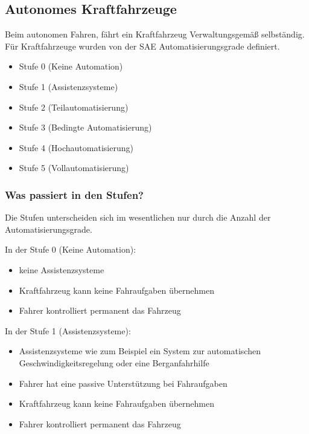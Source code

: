 \subsection{Autonomes Kraftfahrzeuge}
Beim autonomen Fahren, fährt ein Kraftfahrzeug Verwaltungsgemäß selbständig.
Für Kraftfahrzeuge wurden von der \ac{SAE} Automatisierungsgrade definiert\cite{PRACTICE}.
\begin{itemize}
	\item Stufe 0 (Keine Automation)
	\item Stufe 1 (Assistenzsysteme)
	\item Stufe 2 (Teilautomatisierung)
	\item Stufe 3 (Bedingte Automatisierung)
	\item Stufe 4 (Hochautomatisierung)
	\item Stufe 5 (Vollautomatisierung)
\end{itemize}
\subsubsection{Was passiert in den Stufen?}
Die Stufen unterscheiden sich im wesentlichen nur durch die Anzahl der Automatisierungsgrade.

\vspace{0.5cm}

In der Stufe 0 (Keine Automation):
\begin{itemize}
	\item keine Assistenzsysteme
	\item Kraftfahrzeug kann keine Fahraufgaben übernehmen
	\item Fahrer kontrolliert permanent das Fahrzeug
\end{itemize}

\vspace{0.5cm}

In der Stufe 1 (Assistenzsysteme):
\begin{itemize}
	\item Assistenzsysteme wie zum Beispiel ein System zur automatischen Geschwindigkeitsregelung oder eine Berganfahrhilfe
	\item Fahrer hat eine passive Unterstützung bei Fahraufgaben
	\item Kraftfahrzeug kann keine Fahraufgaben übernehmen
	\item Fahrer kontrolliert permanent das Fahrzeug
\end{itemize}

\vspace{0.5cm}

